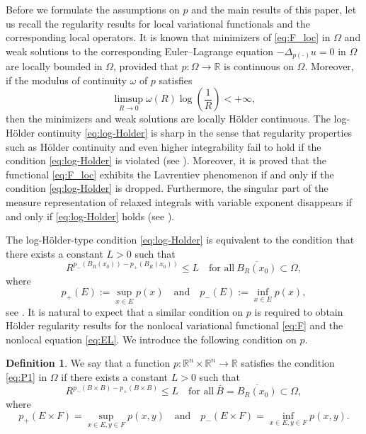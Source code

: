 \documentclass[11pt]{amsart}
\theoremstyle{plain}
\theoremstyle{definition}
\newtheorem{definition}[theorem]{Definition}
\numberwithin{equation}{section}
\begin{document}
Before we formulate the assumptions on $p$ and the main results of this paper, let us recall the regularity results for local variational functionals and the corresponding local operators. It is known \cite{FZ99} that minimizers of \eqref{eq:F_loc} in $\Omega$ and weak solutions to the corresponding Euler--Lagrange equation $-\Delta_{p(\cdot)}u=0$ in $\Omega$ are locally bounded in $\Omega$, provided that $p: \Omega \to \mathbb{R}$ is continuous on $\Omega$. Moreover, if the modulus of continuity $\omega$ of $p$ satisfies 
\begin{equation} \label{eq:log-Holder}
\limsup_{R \to 0} \omega(R) \log \left( \frac{1}{R} \right) < +\infty,
\end{equation}
then the minimizers and weak solutions are locally H\"older continuous. The log-H\"older continuity \eqref{eq:log-Holder} is sharp in the sense that regularity properties such as H\"older continuity and even higher integrability fail to hold if the condition \eqref{eq:log-Holder} is violated (see \cite{Zhi97}). Moreover, it is proved \cite{Zhi97} that the functional \eqref{eq:F_loc} exhibits the Lavrentiev phenomenon if and only if the condition \eqref{eq:log-Holder} is dropped. Furthermore, the singular part of the measure representation of relaxed integrals with variable exponent disappears if and only if \eqref{eq:log-Holder} holds (see \cite{ABF03}).

The log-H\"older-type condition \eqref{eq:log-Holder} is equivalent to the condition that there exists a constant $L > 0$ such that
\begin{equation*}
R^{p_-(B_R(x_0)) - p_+(B_R(x_0))} \leq L \quad \text{for all}~ \overline{B_R(x_0)} \subset \Omega,
\end{equation*}
where
\begin{equation*}
p_+(E) := \sup_{x \in E} p(x) \quad\text{and}\quad p_-(E) := \inf_{x \in E} p(x),
\end{equation*}
see \cite{Die04}. It is natural to expect that a similar condition on $p$ is required to obtain H\"older regularity results for the nonlocal variational functional \eqref{eq:F} and the nonlocal equation \eqref{eq:EL}. We introduce the following condition on $p$.

\begin{definition}
We say that a function $p: \mathbb{R}^n \times \mathbb{R}^n \to \mathbb{R}$ satisfies the condition \eqref{eq:P1} in $\Omega$ if there exists a constant $L > 0$ such that
\begin{equation} \label{eq:P1} \tag{P1}
R^{p_-(B \times B) - p_+(B \times B)} \leq L \quad \text{for all}~ \overline{B} = \overline{B_R(x_0)} \subset \Omega,
\end{equation}
where
\begin{equation*}
p_+(E \times F) = \sup_{x \in E, y \in F} p(x,y) \quad\text{and}\quad p_-(E \times F) = \inf_{x \in E, y \in F} p(x,y).
\end{equation*}
\end{definition}
\end{document}

